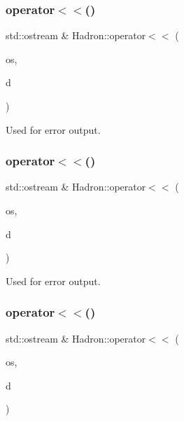 \subsubsection{\texorpdfstring{operator$<$$<$()}{operator<<()}\hspace{0.1cm}{\footnotesize\ttfamily [27/48]}}
{\footnotesize\ttfamily std\+::ostream \& Hadron\+::operator$<$$<$ (\begin{DoxyParamCaption}\item[{std\+::ostream \&}]{os,  }\item[{const \mbox{\hyperlink{structHadron_1_1KeyTetraQuarkElementalOperator__t}{Key\+Tetra\+Quark\+Elemental\+Operator\+\_\+t}} \&}]{d }\end{DoxyParamCaption})}



Used for error output. 

\mbox{\label{namespaceHadron_a24d0db7f972f8d517641ad9235bfa33c}} 
\subsubsection{\texorpdfstring{operator$<$$<$()}{operator<<()}\hspace{0.1cm}{\footnotesize\ttfamily [28/48]}}
{\footnotesize\ttfamily std\+::ostream \& Hadron\+::operator$<$$<$ (\begin{DoxyParamCaption}\item[{std\+::ostream \&}]{os,  }\item[{const \mbox{\hyperlink{structHadron_1_1KeyMesonElementalOperator__t}{Key\+Meson\+Elemental\+Operator\+\_\+t}} \&}]{d }\end{DoxyParamCaption})}



Used for error output. 

\mbox{\label{namespaceHadron_a6447e57d6b19af925c635187757e2f02}} 
\subsubsection{\texorpdfstring{operator$<$$<$()}{operator<<()}\hspace{0.1cm}{\footnotesize\ttfamily [29/48]}}
{\footnotesize\ttfamily std\+::ostream \& Hadron\+::operator$<$$<$ (\begin{DoxyParamCaption}\item[{std\+::ostream \&}]{os,  }\item[{const \mbox{\hyperlink{structHadron_1_1KeyHadronNPartNPtConnGraph__t}{Key\+Hadron\+N\+Part\+N\+Pt\+Conn\+Graph\+\_\+t}} \&}]{d }\end{DoxyParamCaption})}



